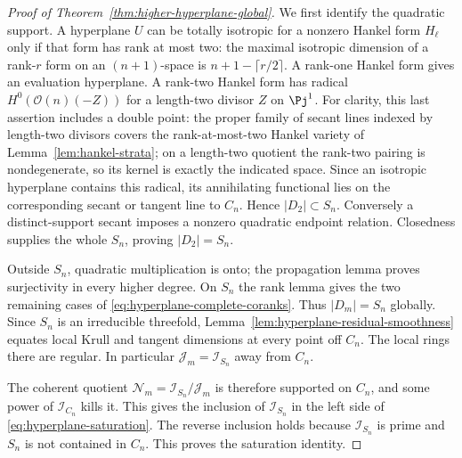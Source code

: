 \begin{proof}[Proof of Theorem~\ref{thm:higher-hyperplane-global}]
We first identify the quadratic support. A hyperplane $U$ can be
totally isotropic for a nonzero Hankel form $H_\ell$ only if that
form has rank at most two: the maximal isotropic dimension of a
rank-$r$ form on an $(n+1)$-space is
$n+1-\lceil r/2\rceil$. A rank-one Hankel form gives an evaluation
hyperplane. A rank-two Hankel form has radical
$H^0(\mathcal O(n)(-Z))$ for a length-two divisor $Z$ on $\Pj^1$.
For clarity, this last assertion includes a double point: the proper
family of secant lines indexed by length-two divisors covers the
rank-at-most-two Hankel variety of Lemma~\ref{lem:hankel-strata};
on a length-two quotient the rank-two pairing is nondegenerate,
so its kernel is exactly the indicated space. Since an isotropic
hyperplane contains this radical, its annihilating functional lies
on the corresponding secant or tangent line to $C_n$. Hence
$|D_2|\subset S_n$. Conversely a distinct-support secant imposes a
nonzero quadratic endpoint relation. Closedness supplies the whole
$S_n$, proving $|D_2|=S_n$.

Outside $S_n$, quadratic multiplication is onto; the propagation
lemma proves surjectivity in every higher degree. On $S_n$ the rank
lemma gives the two remaining cases of
\eqref{eq:hyperplane-complete-coranks}. Thus $|D_m|=S_n$ globally.
Since $S_n$ is an irreducible threefold,
Lemma~\ref{lem:hyperplane-residual-smoothness} equates local Krull
and tangent dimensions at every point off $C_n$. The local rings
there are regular. In particular
$\mathcal J_m=\mathcal I_{S_n}$ away from $C_n$.

The coherent quotient
$\mathcal N_m=\mathcal I_{S_n}/\mathcal J_m$ is therefore
supported on $C_n$, and some power of $\mathcal I_{C_n}$ kills it.
This gives the inclusion of $\mathcal I_{S_n}$ in the left side
of \eqref{eq:hyperplane-saturation}. The reverse inclusion holds
because $\mathcal I_{S_n}$ is prime and $S_n$ is not contained in
$C_n$. This proves the saturation identity.


\end{proof}
